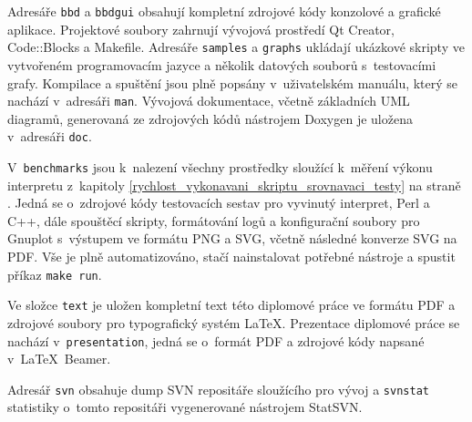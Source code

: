 \documentclass[11pt,twoside,a4paper]{book}
\begin{document}
Adresáře \texttt{bbd} a \texttt{bbdgui} obsahují kompletní zdrojové kódy konzolové a grafické aplikace. Projektové soubory zahrnují vývojová prostředí Qt Creator, Code::Blocks a Makefile. Adresáře \texttt{samples} a \texttt{graphs} ukládají ukázkové skripty ve vytvořeném programovacím jazyce a několik datových souborů s~testovacími grafy. Kompilace a spuštění jsou plně popsány v~uživatelském manuálu, který se nachází v~adresáři \texttt{man}. Vývojová dokumentace, včetně základních UML diagramů, generovaná ze zdrojových kódů nástrojem Doxygen je uložena v~adresáři \texttt{doc}.

V~\texttt{benchmarks} jsou k~nalezení všechny prostředky sloužící k~měření výkonu interpretu z~kapitoly \ref{rychlost_vykonavani_skriptu_srovnavaci_testy} na straně \pageref{rychlost_vykonavani_skriptu_srovnavaci_testy}. Jedná se o~zdrojové kódy testovacích sestav pro vyvinutý interpret, Perl a C++, dále spouštěcí skripty, formátování logů a konfigurační soubory pro Gnuplot s~výstupem ve formátu PNG a SVG, včetně následné konverze SVG na PDF. Vše je plně automatizováno, stačí nainstalovat potřebné nástroje a spustit příkaz \texttt{make run}.

Ve složce \texttt{text} je uložen kompletní text této diplomové práce ve formátu PDF a zdrojové soubory pro typografický systém \LaTeX. Prezentace diplomové práce se nachází v~\texttt{presentation}, jedná se o~formát PDF a zdrojové kódy napsané v~\LaTeX~Beamer.

Adresář \texttt{svn} obsahuje dump SVN repositáře sloužícího pro vývoj a \texttt{svnstat} statistiky o~tomto repositáři vygenerované nástrojem StatSVN.
\end{document}

